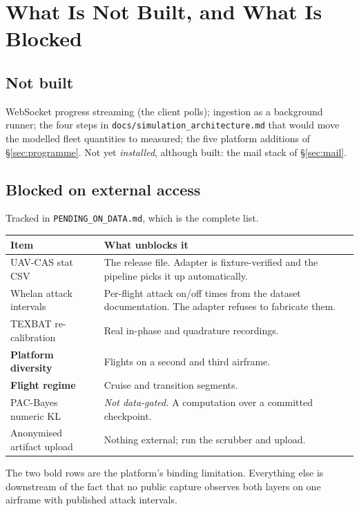 \documentclass[11pt,a4paper]{article}
\newcommand{\code}[1]{\texttt{#1}}
\begin{document}
\section{What Is Not Built, and What Is Blocked}

\subsection{Not built}
WebSocket progress streaming (the client polls); ingestion as a background
runner; the four steps in \code{docs/simulation\_architecture.md} that would
move the modelled fleet quantities to measured; the five platform additions of
\S\ref{sec:programme}. Not yet \emph{installed}, although built: the mail stack
of \S\ref{sec:mail}.

\subsection{Blocked on external access}
\label{sec:blocked}
Tracked in \code{PENDING\_ON\_DATA.md}, which is the complete list.

\begin{table}[H]
\centering\small
\begin{tabularx}{\linewidth}{@{}p{4.4cm}X@{}}
\toprule
\textbf{Item} & \textbf{What unblocks it} \\
\midrule
UAV-CAS stat CSV & The release file. Adapter is fixture-verified and the pipeline picks it up automatically. \\
Whelan attack intervals & Per-flight attack on/off times from the dataset documentation. The adapter refuses to fabricate them. \\
TEXBAT re-calibration & Real in-phase and quadrature recordings. \\
\textbf{Platform diversity} & Flights on a second and third airframe. \\
\textbf{Flight regime} & Cruise and transition segments. \\
PAC-Bayes numeric KL & \emph{Not data-gated.} A computation over a committed checkpoint. \\
Anonymised artifact upload & Nothing external; run the scrubber and upload. \\
\bottomrule
\end{tabularx}
\end{table}

The two bold rows are the platform's binding limitation. Everything else is
downstream of the fact that no public capture observes both layers on one
airframe with published attack intervals.
\end{document}
